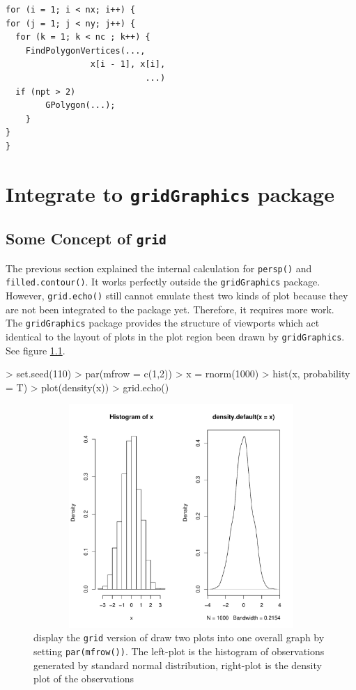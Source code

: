 \documentclass[paper=a4, fontsize=11pt]{report}
\begin{document}
\begin{lstlisting}
for (i = 1; i < nx; i++) {
for (j = 1; j < ny; j++) {
  for (k = 1; k < nc ; k++) {
	FindPolygonVertices(...,
                 x[i - 1], x[i],
		                    ...)
  if (npt > 2)
	    GPolygon(...);
    }
}
}
\end{lstlisting}



\chapter{Integrate to \texttt{gridGraphics} package}
\section{Some Concept of \texttt{grid}}
The previous section explained the internal calculation for \texttt{persp()} and \texttt{filled.contour()}. It works perfectly outside the \texttt{gridGraphics} package. However, \texttt{grid.echo()} still cannot emulate thest two kinds of plot because they are not been integrated to the package yet. Therefore, it requires more work.\\ 
The \texttt{gridGraphics} package provides the structure of viewports which act identical to the layout of plots in the plot region been drawn by \texttt{gridGraphics}. See figure \ref{figure_hist}.
\begin{Schunk}
\begin{Sinput}
> set.seed(110)
> par(mfrow = c(1,2))
> x = rnorm(1000)
> hist(x, probability = T)
> plot(density(x))
> grid.echo()
\end{Sinput}
\end{Schunk}
\begin{figure}[h]
\begin{center}
  \includegraphics[height = 8.5cm, width = 15cm]{figure/viewport_demo_1.pdf}
  \caption{display the \texttt{grid} version of draw two plots into one overall graph by setting \texttt{par(mfrow())}. The left-plot is the histogram of observations generated by standard normal distribution, right-plot is the density plot of the observations}
  	\label{figure_hist}
\end{center}
\end{figure}
\end{document}
